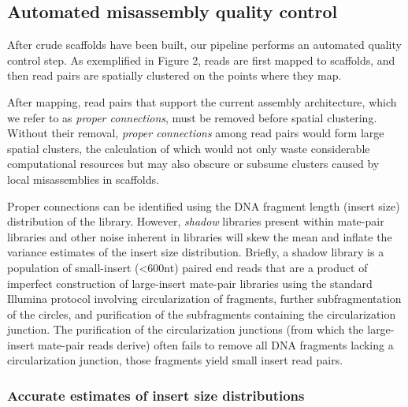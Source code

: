 \documentclass{bioinfo}
\begin{document}
\subsection{Automated misassembly quality control}

After crude scaffolds have been built, our pipeline performs an automated quality control step.
As exemplified in Figure 2, reads are first mapped to scaffolds, and then read pairs are spatially clustered on the
points where they map.

After mapping, read pairs that support the current assembly architecture, which we 
refer to as \emph{proper connections}, must be removed before spatial clustering. Without their removal, \emph{proper connections}
among read pairs would form large spatial clusters, the calculation of which would not only waste considerable 
computational resources but may also obscure or subsume clusters caused by local misassemblies in scaffolds. 

 Proper connections
can be identified using the DNA fragment length (insert size) distribution of the library. However, \emph{shadow} libraries present within 
mate-pair libraries and other noise inherent in libraries will skew the mean and inflate the variance 
estimates of the insert size distribution. Briefly, a shadow library is a population of small-insert (<600nt) paired end reads
that are a product of imperfect construction of large-insert
mate-pair libraries using the standard Illumina protocol involving circularization of fragments, further subfragmentation of the circles, and purification
of the subfragments containing the circularization junction. 
The purification of the circularization junctions (from which the large-insert mate-pair reads derive) 
often fails to remove all DNA fragments lacking a circularization junction, those fragments yield small insert
read pairs. 

\subsubsection{Accurate estimates of insert size distributions}
\end{document}
